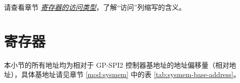 \documentclass[main\_\_CN.tex]{subfiles}
\begin{document}
请查看章节 \hyperref[glossary-access-types]{\textit{寄存器的访问类型}}，了解“访问”列缩写的含义。




\section{寄存器}\label{Section:SPIREGList}

本小节的所有地址均为相对于 GP-SPI2 控制器基地址的地址偏移量（相对地址），具体基地址请见章节 \ref{mod:sysmem} \textit{} 中的表 \ref{tab:sysmem-base-address}。


\end{document}
